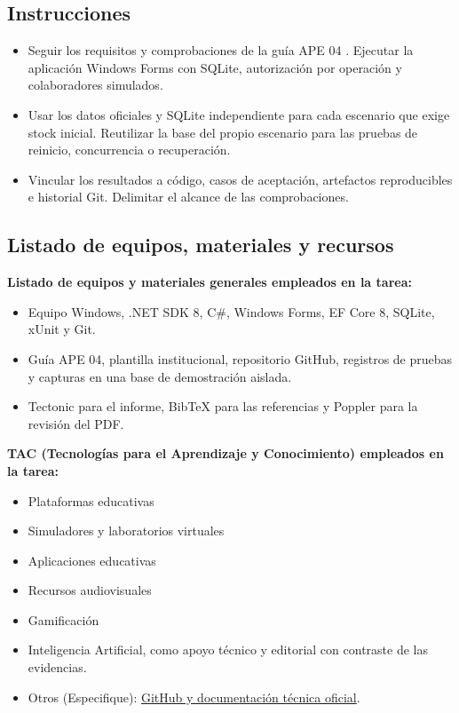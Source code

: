 \documentclass{article}
\begin{document}
\subsection{Instrucciones}
\begin{itemize}
\item Seguir los requisitos y comprobaciones de la guía APE 04 \cite{ape04}. Ejecutar la aplicación Windows Forms con SQLite, autorización por operación y colaboradores simulados.
\item Usar los datos oficiales y SQLite independiente para cada escenario que exige stock inicial. Reutilizar la base del propio escenario para las pruebas de reinicio, concurrencia o recuperación.
\item Vincular los resultados a código, casos de aceptación, artefactos reproducibles e historial Git. Delimitar el alcance de las comprobaciones.
\end{itemize}

\subsection{Listado de equipos, materiales y recursos}
\textbf{Listado de equipos y materiales generales empleados en la tarea:}
\begin{itemize}
\item Equipo Windows, .NET SDK 8, C\#, Windows Forms, EF Core 8, SQLite, xUnit y Git.
\item Guía APE 04, plantilla institucional, repositorio GitHub, registros de pruebas y capturas en una base de demostración aislada.
\item Tectonic para el informe, BibTeX para las referencias y Poppler para la revisión del PDF.
\end{itemize}
\textbf{TAC (Tecnologías para el Aprendizaje y Conocimiento) empleados en la tarea:}
\begin{itemize}
\item[$\square$] Plataformas educativas
\item[$\square$] Simuladores y laboratorios virtuales
\item[$\square$] Aplicaciones educativas
\item[$\square$] Recursos audiovisuales
\item[$\square$] Gamificación
\item[$\checkmark$] Inteligencia Artificial, como apoyo técnico y editorial con contraste de las evidencias.
\item Otros (Especifique): \underline{GitHub y documentación técnica oficial}.
\end{itemize}
\end{document}
